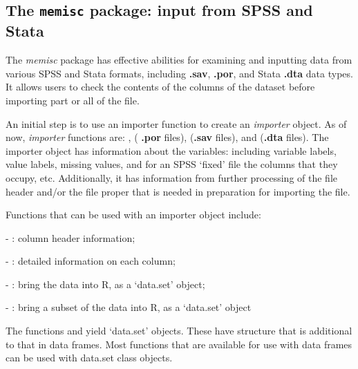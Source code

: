 \subsection{The \texttt{memisc} package: input from SPSS and Stata}


The {\em memisc} package has effective abilities for
examining and inputting data from various SPSS and Stata formats,
including {\bf .sav}, {\bf .por}, and Stata {\bf .dta} data types. 
It allows users to check the contents of the
columns of the dataset before importing part or all of the file.

An initial step is to use an importer function to create an {\em
  importer} object.  As of now, {\em importer} functions are:
,  ( {\bf .por}
files),  ({\bf .sav} files), and
 ({\bf .dta} files). The importer object has
information about the variables: including variable labels, value
labels, missing values, and for an SPSS `fixed' file the columns that
they occupy, etc. Additionally, it has information from further
processing of the file header and/or the file proper that is
needed in preparation for importing the file.

Functions that can be used with an importer object include:
\begin{itemizz}
\item[-] : column header information;
\item[-] : detailed information on each column;
\item[-] : bring the data into R, as a `data.set' object;
\item[-] : bring a subset of the data into R, as a `data.set' object
\end{itemizz}

  
The functions
 and  yield `data.set' objects.
These have structure that is additional to that in data frames.  Most
functions that are available for use with data frames can be used with
data.set class objects.

